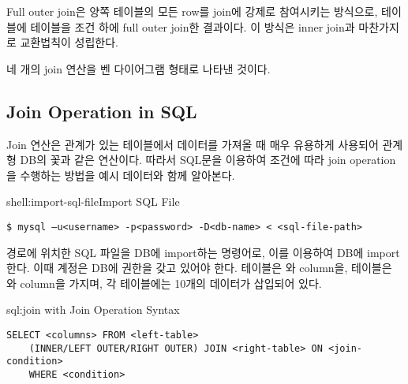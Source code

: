 Full outer join은 양쪽 테이블의 모든 row를 join에 강제로 참여시키는 방식으로, \은  테이블에  테이블을  조건 하에 full outer join한 결과이다. 이 방식은 inner join과 마찬가지로 교환법칙이 성립한다.


\은 네 개의 join 연산을 벤 다이어그램 형태로 나타낸 것이다.

\subsection*{Join Operation in SQL}

Join 연산은 관계가 있는 테이블에서 데이터를 가져올 때 매우 유용하게 사용되어 관계형 DB의 꽃과 같은 연산이다. 따라서 SQL문을 이용하여 조건에 따라 join operation을 수행하는 방법을 예시 데이터와 함께 알아본다.

\begin{shellenv}{shell:import-sql-file}{Import SQL File}\begin{verbatim}
$ mysql –u<username> -p<password> -D<db-name> < <sql-file-path>
\end{verbatim}
\end{shellenv}

\은  경로에 위치한 SQL 파일을  DB에 import하는 명령어로, 이를 이용하여 \을 DB에 import한다. 이때  계정은  DB에 권한을 갖고 있어야 한다.  테이블은 와  column을,  테이블은 와  column을 가지며, 각 테이블에는 10개의 데이터가 삽입되어 있다.

\begin{sqlenv}{sql:join}{ with Join Operation Syntax}\begin{verbatim}
SELECT <columns> FROM <left-table>
    (INNER/LEFT OUTER/RIGHT OUTER) JOIN <right-table> ON <join-condition>
    WHERE <condition>
\end{verbatim}
\end{sqlenv}


